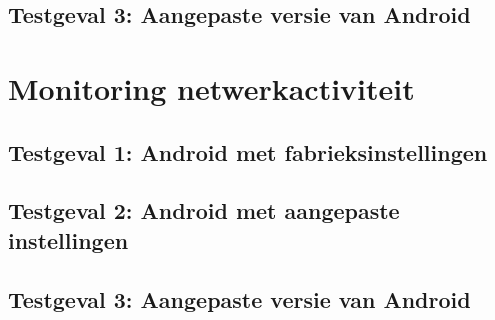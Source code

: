 \subsection{Testgeval 3: Aangepaste versie van Android}

\section{Monitoring netwerkactiviteit}

\subsection{Testgeval 1: Android met fabrieksinstellingen}

\subsection{Testgeval 2: Android met aangepaste instellingen}

\subsection{Testgeval 3: Aangepaste versie van Android}